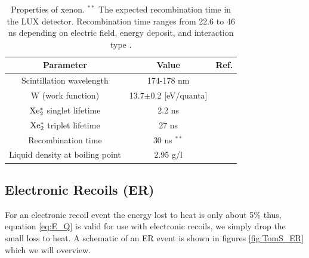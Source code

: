 \renewcommand{\baselinestretch}{1}
\small\normalsize
\begin{table}[h!]
\begin{center}
\begin{tabular}{|c|c|c|}
\hline
Parameter & Value & Ref.\\ \hline
Scintillation wavelength		& 174-178 nm 		&  \cite{Doke_Scintillation} \\ \hline
W (work function)				& 13.7$\pm$0.2 [eV/quanta]	&  \cite{Dahl_Thesis} \\ \hline
$\rm Xe^*_2$	singlet lifetime	& 2.2 ns			& \cite{Xe_singlet_tripplet_lifetime} \cite{Xe_Recombination_Time}\\ \hline
$\rm Xe^*_2 $ triplet lifetime 	& 27 ns			&  \cite{Xe_singlet_tripplet_lifetime} \cite{Xe_Recombination_Time}\\ \hline
Recombination time 			& 30 ns $^{**}$			 & \cite{Recomb_Time_Extraction} \cite{Recomb_Time_NEST}\\ \hline
Liquid density at boiling point	& 2.95 g/l 			& \cite{Xe_Density} \\ \hline
\end{tabular}
\caption{Properties of xenon. $^{**}$ The expected recombination time in the LUX detector. Recombination time ranges from 22.6 to 46 ns depending on electric field, energy deposit, and interaction type \cite{Recomb_Time_NEST}.}
\label{table:Xe_Properties}
\end{center}
\end{table}
\renewcommand{\baselinestretch}{2}
\small\normalsize


\subsection{Electronic Recoils (ER)}
For an electronic recoil event the energy lost to heat is only about 5\% \cite{FanoTheoretical} thus, equation \ref{eq:E_Q} is valid for use with electronic recoils, we simply drop the small loss to heat. A schematic of an ER event is shown in figures \ref{fig:TomS_ER} which we will overview.

